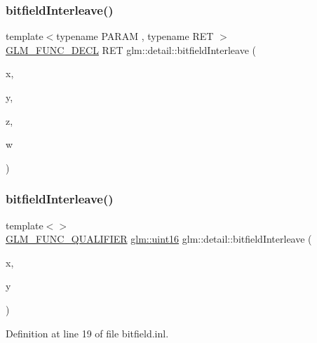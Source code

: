 \subsubsection{\texorpdfstring{bitfieldInterleave()}{bitfieldInterleave()}\hspace{0.1cm}{\footnotesize\ttfamily [3/11]}}
{\footnotesize\ttfamily template$<$typename P\+A\+R\+AM , typename R\+ET $>$ \\
\mbox{\hyperlink{setup_8hpp_ab2d052de21a70539923e9bcbf6e83a51}{G\+L\+M\+\_\+\+F\+U\+N\+C\+\_\+\+D\+E\+CL}} R\+ET glm\+::detail\+::bitfield\+Interleave (\begin{DoxyParamCaption}\item[{P\+A\+R\+AM}]{x,  }\item[{P\+A\+R\+AM}]{y,  }\item[{P\+A\+R\+AM}]{z,  }\item[{P\+A\+R\+AM}]{w }\end{DoxyParamCaption})}

\mbox{\label{namespaceglm_1_1detail_ac59c574dc7900d87786f5a96f82ea6e7}} 
\subsubsection{\texorpdfstring{bitfieldInterleave()}{bitfieldInterleave()}\hspace{0.1cm}{\footnotesize\ttfamily [4/11]}}
{\footnotesize\ttfamily template$<$$>$ \\
\mbox{\hyperlink{setup_8hpp_a33fdea6f91c5f834105f7415e2a64407}{G\+L\+M\+\_\+\+F\+U\+N\+C\+\_\+\+Q\+U\+A\+L\+I\+F\+I\+ER}} \mbox{\hyperlink{group__gtc__type__precision_gad8c2939e1fdd8e5828b31d95c52255d5}{glm\+::uint16}} glm\+::detail\+::bitfield\+Interleave (\begin{DoxyParamCaption}\item[{\mbox{\hyperlink{group__gtc__type__precision_ga1a7dcd8aac97cc8020817c94049deff2}{glm\+::uint8}}}]{x,  }\item[{\mbox{\hyperlink{group__gtc__type__precision_ga1a7dcd8aac97cc8020817c94049deff2}{glm\+::uint8}}}]{y }\end{DoxyParamCaption})}



Definition at line 19 of file bitfield.\+inl.

\mbox{\label{namespaceglm_1_1detail_ac5f2b38221d4447775e88f1b003f8113}} 
